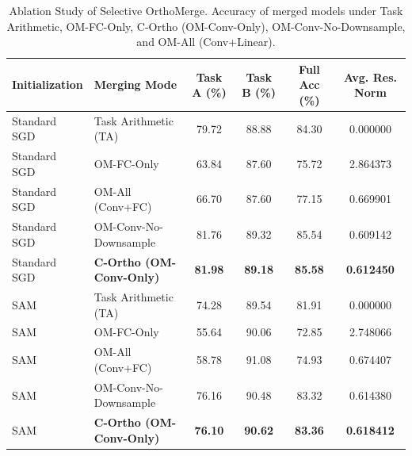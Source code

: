 \documentclass{article}
\begin{document}
\begin{table}[t]
\vspace{-5pt}
\caption{Ablation Study of Selective OrthoMerge. Accuracy of merged models under Task Arithmetic, OM-FC-Only, C-Ortho (OM-Conv-Only), OM-Conv-No-Downsample, and OM-All (Conv+Linear).}
\label{tab:ablation}
\centering
\setlength{\tabcolsep}{5pt}
\begin{tabular}{llcccc}
\toprule
\textbf{Initialization} & \textbf{Merging Mode} & \textbf{Task A (\%)} & \textbf{Task B (\%)} & \textbf{Full Acc (\%)} & \textbf{Avg. Res. Norm} \\
\midrule
Standard SGD & Task Arithmetic (TA) & 79.72 & 88.88 & 84.30 & 0.000000 \\
Standard SGD & OM-FC-Only          & 63.84 & 87.60 & 75.72 & 2.864373 \\
Standard SGD & OM-All (Conv+FC)    & 66.70 & 87.60 & 77.15 & 0.669901 \\
Standard SGD & OM-Conv-No-Downsample & 81.76 & 89.32 & 85.54 & 0.609142 \\
Standard SGD & \textbf{C-Ortho (OM-Conv-Only)} & \textbf{81.98} & \textbf{89.18} & \textbf{85.58} & \textbf{0.612450} \\
\midrule
SAM          & Task Arithmetic (TA) & 74.28 & 89.54 & 81.91 & 0.000000 \\
SAM          & OM-FC-Only          & 55.64 & 90.06 & 72.85 & 2.748066 \\
SAM          & OM-All (Conv+FC)    & 58.78 & 91.08 & 74.93 & 0.674407 \\
SAM          & OM-Conv-No-Downsample & 76.16 & 90.48 & 83.32 & 0.614380 \\
SAM          & \textbf{C-Ortho (OM-Conv-Only)} & \textbf{76.10} & \textbf{90.62} & \textbf{83.36} & \textbf{0.618412} \\
\bottomrule
\end{tabular}
\vspace{-10pt}
\end{table}
\vspace{-10pt}
\end{document}
